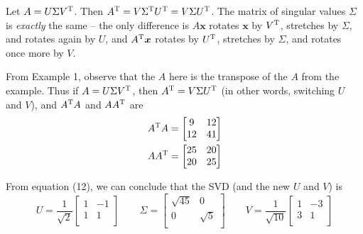 \documentclass[a4paper]{article}
\begin{document}
\vspace{12pt}


Let \(A = U \Sigma V^{\textsc{T}}\). Then \(A^{\textsc{T}} = V \Sigma^{\textsc{T}} U^{\textsc{T}} = V \Sigma U^{\textsc{T}}\). The matrix of singular values \(\Sigma\) is \textit{exactly} the same -- the only difference is \(A \bm{x}\) rotates \(\bm{x}\) by \(V^{\textsc{T}}\), stretches by \(\Sigma\), and rotates again by \(U\), and \(A^{\textsc{T}}\bm{x}\) rotates by \(U^{\textsc{T}}\), stretches by \(\Sigma\), and rotates once more by \(V\).

\vspace{12pt}


From Example 1, observe that the \(A\) here is the transpose of the \(A\) from the example. Thus if \(A = U \Sigma V^{\textsc{T}}\), then \(A^{\textsc{T}} = V \Sigma U^{\textsc{T}}\) (in other words, switching \(U\) and \(V\)), and \(A^{\textsc{T}}A\) and \(AA^{\textsc{T}}\) are
\begin{align*}
	A^{\textsc{T}}A & =
	\begin{bmatrix}
		9 & 12 \\
		12 & 41 \\
	\end{bmatrix} \\
	AA^{\textsc{T}} & =
	\begin{bmatrix}
		25 & 20 \\
		20 & 25 \\
	\end{bmatrix}
\end{align*}

From equation (12), we can conclude that the SVD (and the new \(U\) and \(V\)) is
\[
	U = \frac{1}{\sqrt{2}}
	\begin{bmatrix}
		1 & -1 \\
		1 & 1 \\
	\end{bmatrix}
	\qquad
	\Sigma =
	\begin{bmatrix}
		\sqrt{45} & 0 \\
		0 & \sqrt{5} \\
	\end{bmatrix}
	\qquad
	V = \frac{1}{\sqrt{10}}
	\begin{bmatrix}
		1 & -3 \\
		3 & 1 \\
	\end{bmatrix}
\]
\end{document}
